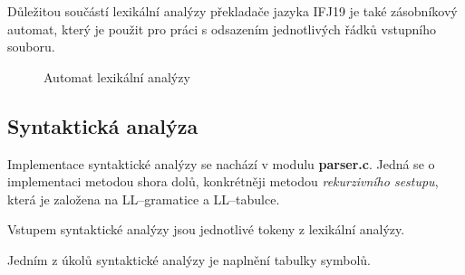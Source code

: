 \documentclass[12pt]{article}
\begin{document}
Důležitou součástí lexikální analýzy překladače jazyka IFJ19 je také zásobníkový automat, který je použit pro práci s odsazením jednotlivých řádků vstupního souboru.
\begin{figure}[!htbp]
    \centering
    \caption{Automat lexikální analýzy}
    \label{obr:1}
\end{figure}
\clearpage
\subsection{Syntaktická analýza}
Implementace syntaktické analýzy se nachází v modulu \textbf{parser.c}. Jedná se o implementaci metodou shora dolů, konkrétněji metodou \textit{rekurzivního sestupu}, která je založena na LL--gramatice a LL--tabulce.

Vstupem syntaktické analýzy jsou jednotlivé tokeny z lexikální analýzy.

Jedním z úkolů syntaktické analýzy je naplnění tabulky symbolů.
\end{document}

